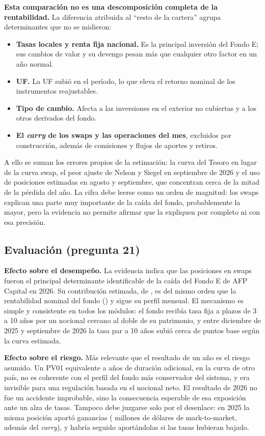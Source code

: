 \documentclass[11pt,letterpaper]{article}
\begin{document}
\textbf{Esta comparación no es una descomposición completa de la rentabilidad.} La
diferencia atribuida al ``resto de la cartera'' agrupa determinantes que no se
midieron:

\begin{itemize}[leftmargin=*]
\item \textbf{Tasas locales y renta fija nacional.} Es la principal inversión del Fondo
E; sus cambios de valor y su devengo pesan más que cualquier otro factor en un año
normal.
\item \textbf{UF.} La UF subió \MIIuf{} en el período, lo que eleva el retorno nominal de
los instrumentos reajustables.
\item \textbf{Tipo de cambio.} Afecta a las inversiones en el exterior no cubiertas y a
los otros derivados del fondo.
\item \textbf{El \emph{carry} de los swaps y las operaciones del mes}, excluidos por
construcción, además de comisiones y flujos de aportes y retiros.
\end{itemize}

A ello se suman los errores propios de la estimación: la curva del Tesoro en lugar de
la curva swap, el peor ajuste de Nelson y Siegel en septiembre de 2026 y el uso de
posiciones estimadas en agosto y septiembre, que concentran cerca de la mitad de la
pérdida del año. La cifra debe leerse como un orden de magnitud: los swaps explican una
parte muy importante de la caída del fondo, probablemente la mayor, pero la evidencia
no permite afirmar que la expliquen por completo ni con esa precisión.

\subsection{Evaluación (pregunta 21)}


\textbf{Efecto sobre el desempeño.} La evidencia indica que las posiciones en swaps
fueron el principal determinante identificable de la caída del Fondo E de AFP Capital
en 2026. Su contribución estimada, de \MIIIswapsAcum, es del mismo orden que la
rentabilidad nominal del fondo (\MIIIfondoAcum) y sigue su perfil mensual. El mecanismo
es simple y consistente en todos los módulos: el fondo recibía tasa fija a plazos de 3
a 10 años por un nocional cercano al doble de su patrimonio, y entre diciembre de 2025
y septiembre de 2026 la tasa par a 10 años subió cerca de \MIIIdifDiez{} puntos base
según la curva estimada.

\textbf{Efecto sobre el riesgo.} Más relevante que el resultado de un año es el riesgo
asumido. Un PV01 equivalente a \MIIIduracion{} años de duración adicional, en la curva
de otro país, no es coherente con el perfil del fondo más conservador del sistema, y
era invisible para una regulación basada en el nocional neto. El resultado de 2026 no
fue un accidente improbable, sino la consecuencia esperable de esa exposición ante un
alza de tasas. Tampoco debe juzgarse solo por el desenlace: en 2025 la misma posición
aportó ganancias (\MIIImtmVeinticinco{} millones de dólares de mark-to-market, además
del \emph{carry}), y habría seguido aportándolas si las tasas hubieran bajado.
\end{document}
